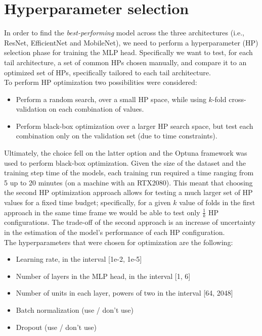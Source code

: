 
\section{Hyperparameter selection} %
In order to find the \textit{best-performing} model across the three architectures (i.e., ResNet, EfficientNet and MobileNet), we need to perform a hyperparameter (HP) selection phase for training the MLP head. Specifically we want to test, for each tail architecture, a set of common HPs chosen manually, and compare it to an optimized set of HPs, specifically tailored to each tail architecture.\\

\noindent
To perform HP optimization two possibilities were considered:

\begin{itemize}
    \item Perform a random search, over a small HP space, while using $k$-fold cross-validation on each combination of values.
    \item Perform black-box optimization over a larger HP search space, but test each combination only on the validation set (due to time constraints).
\end{itemize}

\noindent
Ultimately, the choice fell on the latter option and the Optuna \cite{akiba2019optuna} framework was used to perform black-box optimization. Given the size of the dataset and the training step time of the models, each training run required a time ranging from 5 up to 20 minutes (on a machine with an RTX2080). This meant that choosing the second HP optimization approach allows for testing a much larger set of HP values for a fixed time budget; specifically, for a given $k$ value of folds in the first approach in the same time frame we would be able to test only $\frac{1}{k}$ HP configurations. The trade-off of the second approach is an increase of uncertainty in the estimation of the model's performance of each HP configuration.\\

\noindent
The hyperparameters that were chosen for optimization are the following:
\begin{itemize}
    \item Learning rate, in the interval [1e-2, 1e-5]
    \item Number of layers in the MLP head, in the interval [1, 6]
    \item Number of units in each layer, powers of two in the interval [64, 2048] 
    \item Batch normalization (use / don't use)
    \item Dropout (use / don't use)
\end{itemize}

